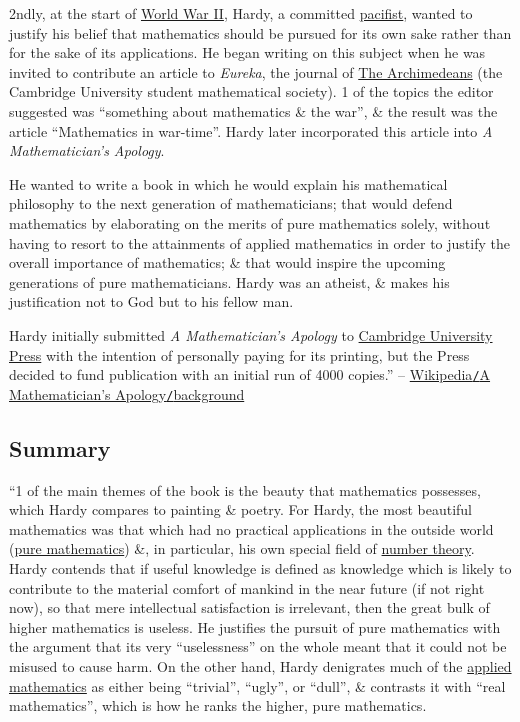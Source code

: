 \documentclass[oneside]{book}
\numberwithin{equation}{section}
\begin{document}
2ndly, at the start of \href{https://en.wikipedia.org/wiki/World_War_II}{World War II}, Hardy, a committed \href{https://en.wikipedia.org/wiki/Pacifist}{pacifist}, wanted to justify his belief that mathematics should be pursued for its own sake rather than for the sake of its applications. He began writing on this subject when he was invited to contribute an article to \textit{Eureka}, the journal of \href{https://en.wikipedia.org/wiki/The_Archimedeans}{The Archimedeans} (the Cambridge University student mathematical society). 1 of the topics the editor suggested was ``something about mathematics \& the war'', \& the result was the article ``Mathematics in war-time''. Hardy later incorporated this article into \textit{A Mathematician's Apology}.

He wanted to write a book in which he would explain his mathematical philosophy to the next generation of mathematicians; that would defend mathematics by elaborating on the merits of pure mathematics solely, without having to resort to the attainments of applied mathematics in order to justify the overall importance of mathematics; \& that would inspire the upcoming generations of pure mathematicians. Hardy was an atheist, \& makes his justification not to God but to his fellow man.

Hardy initially submitted \textit{A Mathematician's Apology} to \href{https://en.wikipedia.org/wiki/Cambridge_University_Press}{Cambridge University Press} with the intention of personally paying for its printing, but the Press decided to fund publication with an initial run of 4000 copies.'' -- \href{https://en.wikipedia.org/wiki/A_Mathematician%27s_Apology#Background}{Wikipedia\texttt{/}A Mathematician's Apology\texttt{/}background}

\subsection{Summary}
``1 of the main themes of the book is the beauty that mathematics possesses, which Hardy compares to painting \& poetry. For Hardy, the most beautiful mathematics was that which had no practical applications in the outside world (\href{https://en.wikipedia.org/wiki/Pure_mathematics}{pure mathematics}) \&, in particular, his own special field of \href{https://en.wikipedia.org/wiki/Number_theory}{number theory}. Hardy contends that if useful knowledge is defined as knowledge which is likely to contribute to the material comfort of mankind in the near future (if not right now), so that mere intellectual satisfaction is irrelevant, then the great bulk of higher mathematics is useless. He justifies the pursuit of pure mathematics with the argument that its very ``uselessness'' on the whole meant that it could not be misused to cause harm. On the other hand, Hardy denigrates much of the \href{https://en.wikipedia.org/wiki/Applied_mathematics}{applied mathematics} as either being ``trivial'', ``ugly'', or ``dull'', \& contrasts it with ``real mathematics'', which is how he ranks the higher, pure mathematics.
\end{document}

